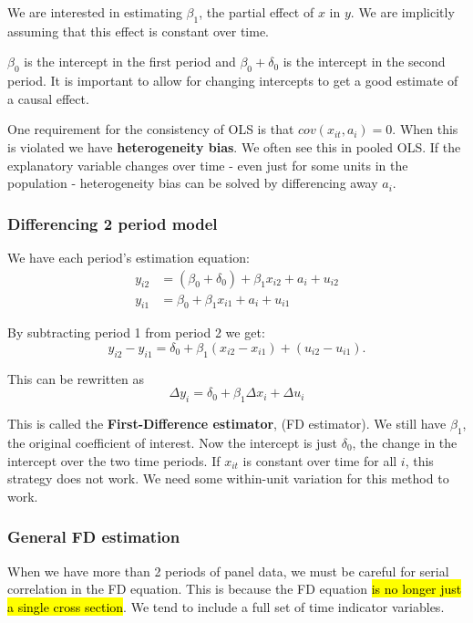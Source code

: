 \documentclass[11pt]{article}
\begin{document}
We are interested in estimating $\beta_1$, the partial effect of $x$ in $y$. We are implicitly assuming that this effect is constant over time.

$\beta_0$ is the intercept in the first period and $\beta_0 + \delta_0$ is the intercept in the second period. It is important to allow for changing intercepts to get a good estimate of a causal effect.

One requirement for the consistency of OLS is that $cov(x_{it},a_i) = 0$. When this is violated we have \textbf{heterogeneity bias}. We often see this in pooled OLS. If the explanatory variable changes over time - even just for some units in the population - heterogeneity bias can be solved by differencing away $a_i$.

\subsubsection{Differencing 2 period model}

We have each period's estimation equation:
\begin{align}
 y_{i2} &= (\beta_0 + \delta_0) + \beta_1 x_{i2} + a_i + u_{i2} \\
 y_{i1} &= \beta_0 + \beta_1 x_{i1} + a_i + u_{i1}
\end{align}

By subtracting period 1 from period 2 we get:
\begin{equation}
    y_{i2} - y_{i1} = \delta_0 + \beta_1(x_{i2} - x_{i1}) + (u_{i2} - u_{i1}).
\end{equation}

This can be rewritten as 
\begin{equation}
    \label{differenced two period panel}
    \Delta y_i = \delta_0 + \beta_1 \Delta x_i + \Delta u_i
\end{equation}

This is called the \textbf{First-Difference estimator}, (FD estimator). We still have $\beta_1$, the original coefficient of interest. Now the intercept is just $\delta_0$, the change in the intercept over the two time periods. If $x_{it}$ is constant over time for all $i$, this strategy does not work. We need some within-unit variation for this method to work.

\subsubsection{General FD estimation}

When we have more than 2 periods of panel data, we must be careful for serial correlation in the FD equation. This is because the FD equation \hl{is no longer just a single cross section}. We tend to include a full set of time indicator variables.
\end{document}
